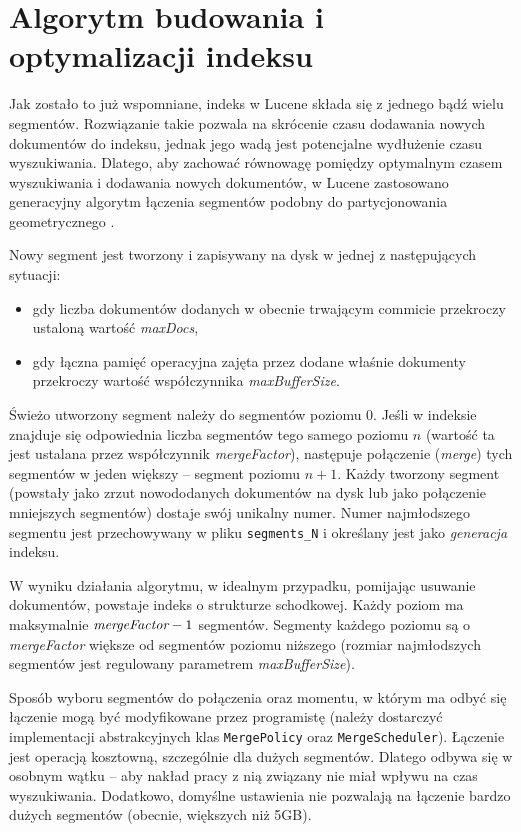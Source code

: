 \section{Algorytm budowania i optymalizacji indeksu}

Jak zostało to już wspomniane, indeks w Lucene składa się z jednego bądź wielu segmentów. Rozwiązanie takie pozwala na skrócenie czasu dodawania nowych dokumentów do indeksu, jednak jego wadą jest potencjalne wydłużenie czasu wyszukiwania. Dlatego, aby zachować równowagę pomiędzy optymalnym czasem wyszukiwania i dodawania nowych dokumentów, w Lucene zastosowano generacyjny algorytm łączenia segmentów podobny do partycjonowania geometrycznego \cite{geopart}. 

Nowy segment jest tworzony i zapisywany na dysk w jednej z następujących sytuacji:
\begin{itemize}
 \item gdy liczba dokumentów dodanych w obecnie trwającym commicie przekroczy ustaloną wartość \emph{maxDocs},
 \item gdy łączna pamięć operacyjna zajęta przez dodane właśnie dokumenty przekroczy wartość współczynnika \emph{maxBufferSize}.
\end{itemize}
Świeżo utworzony segment należy do segmentów poziomu 0. Jeśli w indeksie znajduje się odpowiednia liczba segmentów tego samego poziomu $n$ (wartość ta jest ustalana przez współczynnik \emph{mergeFactor}), następuje połączenie (\emph{merge}) tych segmentów w jeden większy -- segment poziomu $n+1$. Każdy tworzony segment (powstały jako zrzut nowododanych dokumentów na dysk lub jako połączenie mniejszych segmentów) dostaje swój unikalny numer. Numer najmłodszego segmentu jest przechowywany w pliku \texttt{segments\_N} i określany jest jako \emph{generacja} indeksu.

W wyniku działania algorytmu, w idealnym przypadku, pomijając usuwanie dokumentów, powstaje indeks o strukturze schodkowej. Każdy poziom ma maksymalnie $\emph{mergeFactor} - 1$ segmentów. Segmenty każdego poziomu są o \emph{mergeFactor} większe od segmentów poziomu niższego (rozmiar najmłodszych segmentów jest regulowany parametrem \emph{maxBufferSize}).

Sposób wyboru segmentów do połączenia oraz momentu, w którym ma odbyć się łączenie mogą być modyfikowane przez programistę (należy dostarczyć implementacji abstrakcyjnych klas \texttt{MergePolicy} oraz \texttt{MergeScheduler}). Łączenie jest operacją kosztowną, szczególnie dla dużych segmentów. Dlatego odbywa się w osobnym wątku -- aby nakład pracy z nią związany nie miał wpływu na czas wyszukiwania. Dodatkowo, domyślne ustawienia nie pozwalają na łączenie bardzo dużych segmentów (obecnie, większych niż 5GB).
